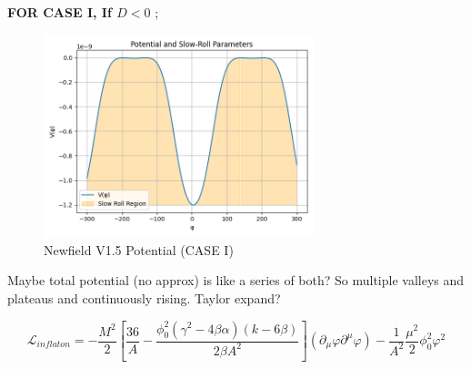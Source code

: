\documentclass{article}
\begin{document}
\textbf{FOR CASE I, If $D < 0$ };

\begin{figure}[h!]
    \centering
    \includegraphics[width=0.7\textwidth]{Python/Figures/New Potenial V1,5 with gravity.png}
    \caption{Newfield V1.5 Potential (CASE I)}
    \label{Newfield V1.5 as func of N}
\end{figure}

Maybe total potential (no approx) is like a series of both? So multiple valleys and plateaus and continuously rising. Taylor expand?

\begin{equation}
    \mathcal{L}_{inflaton} = - \frac{M^2}{2} \left[\frac{36}{A} - \frac{\phi_0^2 (\gamma^2 - 4\beta\alpha)(k-6\beta)}{2\beta A^2}\right] (\partial_\mu \varphi \partial^\mu \varphi) -  \frac{1}{A^2} \frac{\mu^2}{2} \phi^2_0 \varphi^2 
\end{equation}


\newpage

\printbibliography
\end{document}
